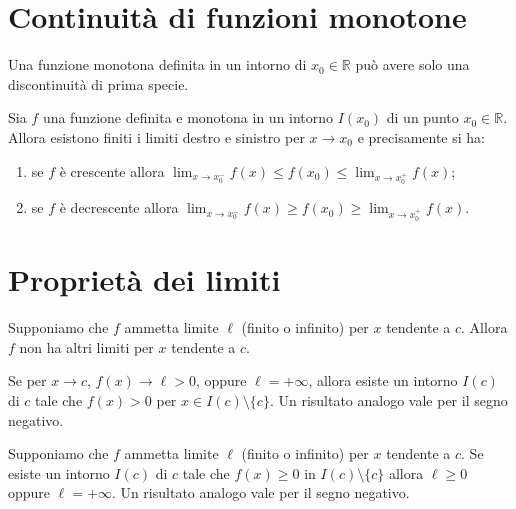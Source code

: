\documentclass[11pt,a4paper]{article}
\begin{document}
\section{Continuità di funzioni monotone}

\begin{osservazione}
Una funzione monotona definita in un intorno di $x_0 \in \mathbb{R}$ può avere solo una discontinuità di prima specie.
\end{osservazione}

\begin{teorema}[Corollario]
Sia $f$ una funzione definita e monotona in un intorno $I(x_0)$ di un punto $x_0 \in \mathbb{R}$. Allora esistono finiti i limiti destro e sinistro per $x \to x_0$ e precisamente si ha:
\begin{enumerate}
    \item[(i)] se $f$ è crescente allora $\displaystyle\lim_{x\to x_0^-} f(x) \le f(x_0) \le \lim_{x\to x_0^+} f(x)$;
    \item[(ii)] se $f$ è decrescente allora $\displaystyle\lim_{x\to x_0^-} f(x) \ge f(x_0) \ge \lim_{x\to x_0^+} f(x)$.
\end{enumerate}
\end{teorema}

\section{Proprietà dei limiti}

\begin{teorema}
Supponiamo che $f$ ammetta limite $\ell$ (finito o infinito) per $x$ tendente a $c$. Allora $f$ non ha altri limiti per $x$ tendente a $c$.
\end{teorema}

\begin{teorema}
Se per $x \to c$, $f(x) \to \ell > 0$, oppure $\ell = +\infty$, allora esiste un intorno $I(c)$ di $c$ tale che $f(x) > 0$ per $x \in I(c) \setminus \{c\}$. Un risultato analogo vale per il segno negativo.
\end{teorema}

\begin{teorema}
Supponiamo che $f$ ammetta limite $\ell$ (finito o infinito) per $x$ tendente a $c$. Se esiste un intorno $I(c)$ di $c$ tale che $f(x) \ge 0$ in $I(c) \setminus \{c\}$ allora $\ell \ge 0$ oppure $\ell = +\infty$. Un risultato analogo vale per il segno negativo.
\end{teorema}
\end{document}
